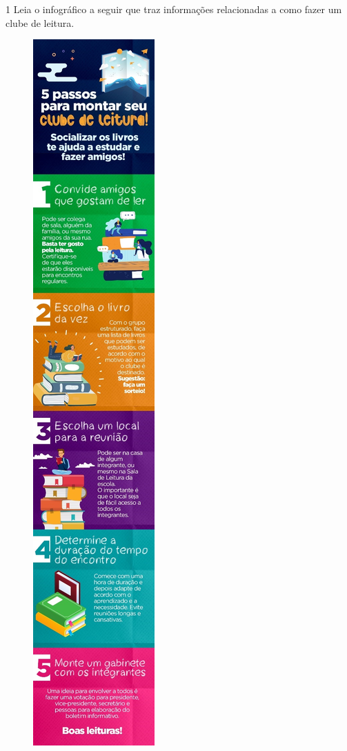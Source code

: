 
\num{1} Leia o infográfico a seguir que traz informações relacionadas a
como fazer um clube de leitura.

\begin{figure}[htpb!]
\includegraphics[width=\textwidth]{media/image32.jpeg}
\end{figure}


